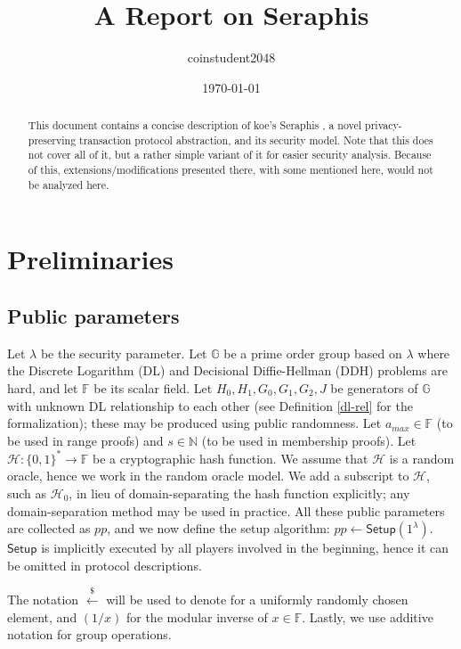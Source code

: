 \documentclass{article}
\title{A Report on Seraphis}
\author{coinstudent2048}
\date{\today}
\theoremstyle{plain}
\theoremstyle{remark}
\begin{document}
\maketitle

\begin{abstract}
This document contains a concise description of koe's Seraphis \cite{seraphis}, a novel privacy-preserving transaction protocol abstraction, and its security model. Note that this does not cover all of it, but a rather simple variant of it for easier security analysis. Because of this, extensions/modifications presented there, with some mentioned here, would not be analyzed here.
\end{abstract}


\section{Preliminaries}
\subsection{Public parameters}
Let $\lambda$ be the security parameter. Let $\mathbb{G}$ be a prime order group based on $\lambda$ where the Discrete Logarithm (DL) and Decisional Diffie-Hellman (DDH) problems are hard, and let $\mathbb{F}$ be its scalar field. Let $H_0, H_1, G_0, G_1, G_2, J$ be generators of $\mathbb{G}$ with unknown DL relationship to each other (see Definition \ref{dl-rel} for the formalization); these may be produced using public randomness. Let $a_{max}\in\mathbb{F}$ (to be used in range proofs) and $s\in\mathbb{N}$ (to be used in membership proofs). Let $\mathcal{H}:\{0,1\}^*\rightarrow\mathbb{F}$ be a cryptographic hash function. We assume that $\mathcal{H}$ is a random oracle, hence we work in the random oracle model. We add a subscript to $\mathcal{H}$, such as $\mathcal{H}_0$, in lieu of domain-separating the hash function explicitly; any domain-separation method may be used in practice. All these public parameters are collected as $pp$, and we now define the setup algorithm: $pp\leftarrow\textsf{Setup}(1^{\lambda})$. $\textsf{Setup}$ is implicitly executed by all players involved in the beginning, hence it can be omitted in protocol descriptions.

The notation $\xleftarrow{\$}$ will be used to denote for a uniformly randomly chosen element, and $(1/x)$ for the modular inverse of $x\in\mathbb{F}$. Lastly, we use additive notation for group operations.
\end{document}
